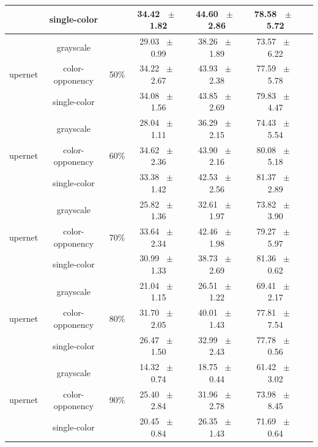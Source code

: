 \begin{table}[h]
\begin{tabular}{@{}lccc ccc@{}}
    & single-color &  & 34.42 ~$\pm$~ 1.82 & 44.60 ~$\pm$~ 2.86 & 78.58 ~$\pm$~ 5.72 \\
    \midrule
    \multirow{3}{*}{upernet} & grayscale & \multirow{3}{*}{50\%} & 29.03 ~$\pm$~ 0.99 & 38.26 ~$\pm$~ 1.89 & 73.57 ~$\pm$~ 6.22 \\
    & color-opponency &  & 34.22 ~$\pm$~ 2.67 & 43.93 ~$\pm$~ 2.38 & 77.59 ~$\pm$~ 5.78 \\
    & single-color &  & 34.08 ~$\pm$~ 1.56 & 43.85 ~$\pm$~ 2.69 & 79.83 ~$\pm$~ 4.47 \\
    \midrule
    \multirow{3}{*}{upernet} & grayscale & \multirow{3}{*}{60\%} & 28.04 ~$\pm$~ 1.11 & 36.29 ~$\pm$~ 2.15 & 74.43 ~$\pm$~ 5.54 \\
    & color-opponency &  & 34.62 ~$\pm$~ 2.36 & 43.90 ~$\pm$~ 2.16 & 80.08 ~$\pm$~ 5.18 \\
    & single-color &  & 33.38 ~$\pm$~ 1.42 & 42.53 ~$\pm$~ 2.56 & 81.37 ~$\pm$~ 2.89 \\
    \midrule
    \multirow{3}{*}{upernet} & grayscale & \multirow{3}{*}{70\%} & 25.82 ~$\pm$~ 1.36 & 32.61 ~$\pm$~ 1.97 & 73.82 ~$\pm$~ 3.90 \\
    & color-opponency &  & 33.64 ~$\pm$~ 2.34 & 42.46 ~$\pm$~ 1.98 & 79.27 ~$\pm$~ 5.97 \\
    & single-color &  & 30.99 ~$\pm$~ 1.33 & 38.73 ~$\pm$~ 2.69 & 81.36 ~$\pm$~ 0.62 \\
    \midrule
    \multirow{3}{*}{upernet} & grayscale & \multirow{3}{*}{80\%} & 21.04 ~$\pm$~ 1.15 & 26.51 ~$\pm$~ 1.22 & 69.41 ~$\pm$~ 2.17 \\
    & color-opponency &  & 31.70 ~$\pm$~ 2.05 & 40.01 ~$\pm$~ 1.43 & 77.81 ~$\pm$~ 7.54 \\
    & single-color &  & 26.47 ~$\pm$~ 1.50 & 32.99 ~$\pm$~ 2.43 & 77.78 ~$\pm$~ 0.56 \\
    \midrule
    \multirow{3}{*}{upernet} & grayscale & \multirow{3}{*}{90\%} & 14.32 ~$\pm$~ 0.74 & 18.75 ~$\pm$~ 0.44 & 61.42 ~$\pm$~ 3.02 \\
    & color-opponency &  & 25.40 ~$\pm$~ 2.84 & 31.96 ~$\pm$~ 2.78 & 73.98 ~$\pm$~ 8.45 \\
    & single-color &  & 20.45 ~$\pm$~ 0.84 & 26.35 ~$\pm$~ 1.43 & 71.69 ~$\pm$~ 0.64 \\
    \midrule
    \bottomrule
  \end{tabular}
  \label{tab:sparse_results_upernet_acdc_rain}
\end{table}
